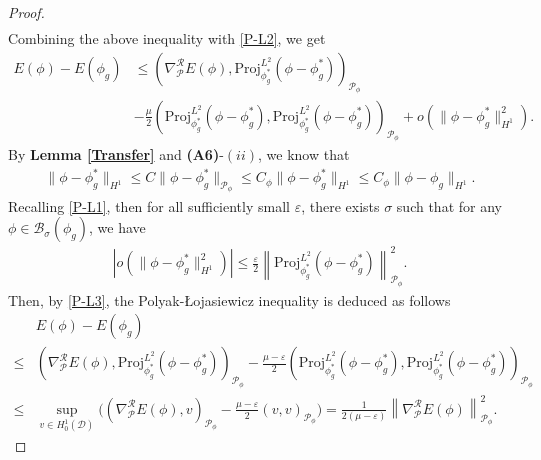 \documentclass[10pt,a4paper]{amsart}
\begin{document}
\begin{proof}
\begin{align*}
	\end{align*}
	Combining the above inequality with \eqref{P-L2}, we get
	\begin{align}\label{P-L3}
		\nonumber E(\phi)-E(\phi_g)&\le\left(\nabla^{\mathcal{R}}_{\mathcal{P}} E(\phi),\text{Proj}^{L^2}_{\phi_g^*}(\phi-\phi_g^*)\right)_{\mathcal{P}_{\phi}}\\
		&-\frac{\mu}{2}\left(\text{Proj}^{L^2}_{\phi_g^*}(\phi-\phi_g^*),\text{Proj}^{L^2}_{\phi_g^*}(\phi-\phi_g^*)\right)_{\mathcal{P}_{\phi}}+o\left(\|\phi-\phi_g^*\|^2_{H^1}\right).
	\end{align}
	By {\bf Lemma \ref{Transfer}} and {\bf (A6)}-$(ii)$, we know that 
	\begin{align}\label{phi_g^*-phi_g}
		\|\phi-\phi_g^*\|_{{H^1}}\le C\|\phi-\phi_g^*\|_{\mathcal{P}_{\phi}}\le C_{\phi}\|\phi-\phi_g^*\|_{H^1}\le C_{\phi} \|\phi-\phi_g\|_{H^1}. 
	\end{align}
	Recalling \eqref{P-L1}, then for all sufficiently small $\varepsilon$, there exists $\sigma$ such that for any $\phi \in \mathcal{B}_{\sigma}(\phi_g)$, we have
	\begin{align}\label{P-L4}
		\left|o\left(\|\phi-\phi_g^*\|^2_{H^1}\right)\right|\le\frac{\varepsilon}{2}\left\|\text{Proj}^{L^2}_{\phi_g^*}(\phi-\phi_g^*)\right\|^2_{\mathcal{P}_{\phi}}.
	\end{align}
	Then, by \eqref{P-L3}, the Polyak-\L ojasiewicz inequality is deduced as follows
	\begin{align*}
		&E(\phi)-E(\phi_g)\\
		\le&\left(\nabla^{\mathcal{R}}_{\mathcal{P}} E(\phi),\text{Proj}^{L^2}_{\phi_g^*}(\phi-\phi_g^*)\right)_{\mathcal{P}_{\phi}}-\frac{\mu-\varepsilon}{2}\left(\text{Proj}^{L^2}_{\phi_g^*}(\phi-\phi_g^*),\text{Proj}^{L^2}_{\phi_g^*}(\phi-\phi_g^*)\right)_{\mathcal{P}_{\phi}}\\
		\le&\sup\limits_{v\in H_0^1(\mathcal{D})}\Bigg(\left( \nabla^{\mathcal{R}}_{\mathcal{P}} E(\phi),v\right)_{\mathcal{P}_{\phi}}-\frac{\mu-\varepsilon}{2}(v,v)_{\mathcal{P}_{\phi}}\Bigg)
		=\frac{1}{2(\mu-\varepsilon)}\left\|\nabla^{\mathcal{R}}_{\mathcal{P}} E(\phi)\right\|^2_{\mathcal{P}_{\phi}}.
	\end{align*}
\end{proof}
\end{document}
